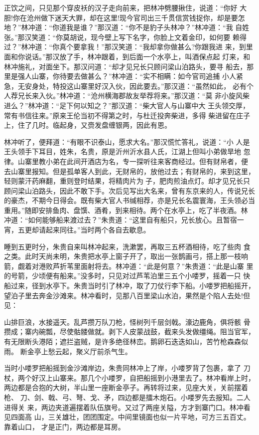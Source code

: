 正饮之间，只见那个穿皮袄的汉子走向前来，把林冲劈腰揪住，说道：“你好
大胆!你在沧州做下迷天大罪，却在这里!现今官司出三千贯信赏钱捉你，却是要怎
地？”林冲道：“你道我是谁？”那汉道：“你不是豹子头林冲？”林冲道：“我
自姓张。”那汉笑道：“你莫胡说，现今壁上写下名字，你脸上文着金印，如何要
赖得过？”林冲道：“你真个要拿我！”那汉笑道：“我却拿你做甚么?你跟我进
来，到里面和你说话。”那汉放了手，林冲跟着，到后面一个水亭上，叫酒保点起
灯来，和林冲施礼，对面坐下。那汉问道：“却才见兄长只顾问梁山泊路头，要寻
船去，那里是强人山寨，你待要去做甚么？”林冲道：“实不相瞒：如今官司追捕
小人紧急，无安身处，特投这山寨里好汉入伙，因此要去。”那汉道：“虽然如此，
必有个人荐兄长来入伙。”林冲道：“沧州横海郡故友举荐将来。”那汉道：“莫
非小旋风柴进么？”林冲道：“足下何以知之？”那汉道：“柴大官人与山寨中大
王头领交厚，常有书信往来。”原来王伦当初不得第之时，与杜迁投奔柴进，多得
柴进留在庄子上，住了几时。临起身，又赍发盘缠银两，因此有恩。

林冲听了，便拜道：“有眼不识泰山，愿求大名。”那汉慌忙答礼，说道：“小
人是王头领手下耳目，姓朱，名贵，原是沂州沂水县人氏，江湖上但叫小弟做旱地
忽律。山寨里教小弟在此间开酒店为名，专一探听往来客商经过。但有财帛者，便
去山寨里报知。但是孤单客人到此，无财帛的，放他过去；有财帛的，来到这里，
轻则蒙汗药麻翻，重则登时结果，将精肉片为子，肥肉煎油点灯。却才见兄长只
顾问梁山泊路头，因此不敢下手。次后见写出大名来，曾有东京来的人，传说兄长
的豪杰，不期今日得会。既有柴大官人书缄相荐，亦是兄长名震寰海，王头领必当
重用。”随即安排鱼肉、盘馔、酒肴，到来相待。两个在水亭上，吃了半夜酒。林
冲道：“如何能够船来渡过去？”朱贵道：“这里自有船只，兄长放心。且暂宿一
宵，五更却请起来同往。”当时两个各自去歇息。

睡到五更时分，朱贵自来叫林冲起来，洗漱罢，再取三五杯酒相待，吃了些肉
食之类。此时天尚未明，朱贵把水亭上窗子开了，取出一张鹊画弓，搭上那一枝响
箭，觑着对港败芦折苇里面射将去。林冲道：“此是何意？”朱贵道：“此是山寨
里的号箭，少顷便有船来。”没多时，只见对过芦苇泊里三五个小喽罗，摇着一只
快船过来，径到水亭下。朱贵当时引了林冲，取了刀仗行李下船。小喽罗把船摇开，
望泊子里去奔金沙滩来。林冲看时，见那八百里梁山水泊，果然是个陷人去处!但
见：

山排巨浪，水接遥天。乱芦攒万队刀枪，怪树列千层剑戟。濠边鹿角，俱将骸
骨攒成；寨内碗瓢，尽使骷髅做就。剥下人皮蒙战鼓，截来头发做缰绳。阻当官军，
有无限断头港陌；遮拦盗贼，是许多绝径林峦。鹅卵石迭迭如山，苦竹枪森森似雨。
断金亭上愁云起，聚义厅前杀气生。

当时小喽罗把船摇到金沙滩岸边，朱贵同林冲上了岸，小喽罗背了包裹，拿了
刀杖，两个好汉上山寨来。那几个小喽罗，自把船摇到小港里去了。林冲看岸上时，
两边都是合抱的大树，半山里一座断金亭子。再转将过来，见座大关，关前摆着枪、
刀、剑、戟、弓、弩、戈、矛，四边都是擂木炮石。小喽罗先去报知。二人进得关
来，两边夹道遍摆着队伍旗号。又过了两座关隘，方才到寨门口。林冲看见四面高
山，三关雄壮，团团围定。中间里镜面也似一片平地，可方三五百丈。靠着山口，
才是正门，两边都是耳房。

